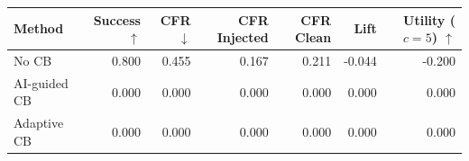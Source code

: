 \begin{tabular}{lrrrrrr}
\toprule
Method & Success $\uparrow$ & CFR $\downarrow$ & CFR Injected & CFR Clean & Lift & Utility ($c=5$) $\uparrow$ \\
\midrule
No CB & 0.800 & 0.455 & 0.167 & 0.211 & -0.044 & -0.200 \\
AI-guided CB & 0.000 & 0.000 & 0.000 & 0.000 & 0.000 & 0.000 \\
Adaptive CB & 0.000 & 0.000 & 0.000 & 0.000 & 0.000 & 0.000 \\
\bottomrule
\end{tabular}
